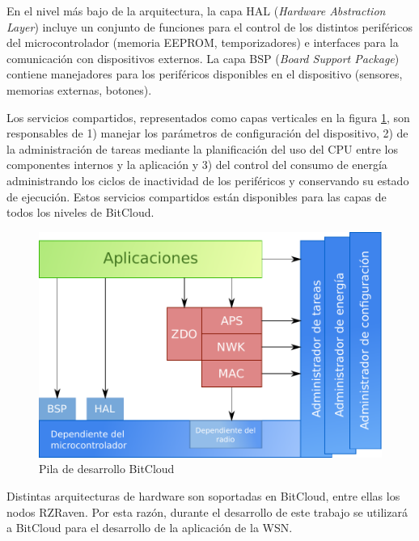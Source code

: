 En el nivel más bajo de la arquitectura, la capa HAL (\textit{Hardware Abstraction Layer}) incluye un conjunto de funciones para el control de los distintos periféricos del microcontrolador (memoria EEPROM, temporizadores) e interfaces para la comunicación con dispositivos externos. La capa BSP (\textit{Board Support Package}) contiene manejadores para los periféricos disponibles en el dispositivo (sensores, memorias externas, botones). 

Los servicios compartidos, representados como capas verticales en la figura \ref{fig:bitcloud}, son responsables de 1) manejar los parámetros de configuración del dispositivo, 2) de la administración de tareas mediante la planificación del uso del CPU entre los componentes internos y la aplicación y 3) del control del consumo de energía administrando los ciclos de inactividad de los periféricos y conservando su estado de ejecución. Estos servicios compartidos están disponibles para las capas de todos los niveles de BitCloud.

\begin{figure}
	\centering 
	\includegraphics[scale=0.5]{capitulo_2_imgs/pila_bitcloud.pdf}
	\caption{Pila de desarrollo BitCloud}
	\label{fig:bitcloud}
\end{figure}

Distintas arquitecturas de hardware son soportadas en BitCloud, entre ellas los nodos RZRaven. Por esta razón, durante el desarrollo de este trabajo se utilizará a BitCloud para el desarrollo de la aplicación de la WSN. 

